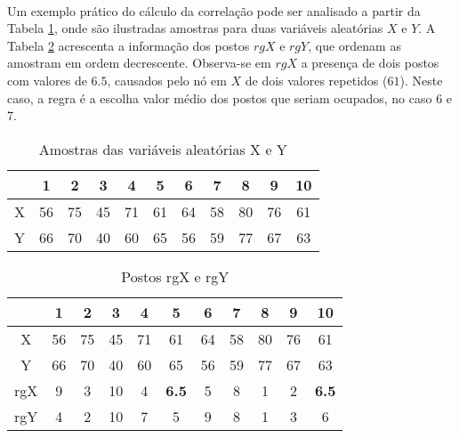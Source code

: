 \paragraph{} Um exemplo prático do cálculo da correlação pode ser analisado a partir da Tabela \ref{tab:1}, onde são ilustradas amostras para duas variáveis aleatórias \begin{math}X\end{math} e \begin{math}Y\end{math}. A Tabela \ref{tab:2} acrescenta a informação dos postos \begin{math}rgX\end{math} e \begin{math}rgY\end{math}, que ordenam as amostram em ordem decrescente. Observa-se em \begin{math}rgX\end{math} a presença de dois postos com valores de \begin{math}6.5\end{math}, causados pelo nó em \begin{math}X\end{math} de dois valores repetidos (\begin{math}61\end{math}). Neste caso, a regra é a escolha valor médio dos postos que seriam ocupados, no caso 6 e 7.

\begin{table}[h!]
    \begin{center}
        \begin{tabular}{ c|cccccccccc }
            & 1 & 2 & 3 & 4 & 5 & 6 & 7 & 8 & 9 & 10 \\
            \hline
            X & 56 & 75 & 45 & 71 & 61 & 64 & 58 & 80 & 76 & 61 \\
            Y & 66 & 70 & 40 & 60 & 65 & 56 & 59 & 77 & 67 & 63 \\
        \end{tabular}
        \caption{Amostras das variáveis aleatórias X e Y}
        \label{tab:1}
    \end{center}
\end{table}

\begin{table}[h!]
    \begin{center}
        \begin{tabular}{ c|cccccccccc }
            & 1 & 2 & 3 & 4 & 5 & 6 & 7 & 8 & 9 & 10 \\
            \hline
            X & 56 & 75 & 45 & 71 & 61 & 64 & 58 & 80 & 76 & 61 \\
            Y & 66 & 70 & 40 & 60 & 65 & 56 & 59 & 77 & 67 & 63 \\
            \hline
            rgX & 9 & 3 & 10 & 4 & \textbf{6.5} & 5 & 8 & 1 & 2 & \textbf{6.5} \\
            rgY & 4 & 2 & 10 & 7 & 5 & 9 & 8 & 1 & 3 & 6 \\
        \end{tabular}
        \caption{Postos rgX e rgY}
        \label{tab:2}
    \end{center}
\end{table}

